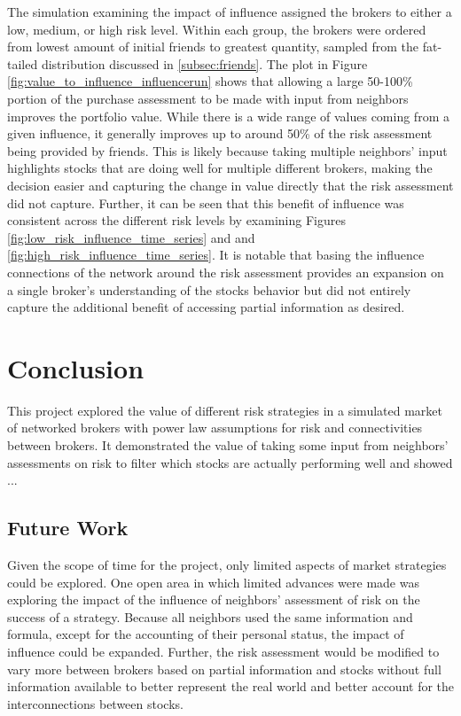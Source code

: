\documentclass[letterpaper, 10 pt, proceedings]{ieeetran}
\begin{document}
	The simulation examining the impact of influence assigned the brokers to either a low, medium, or high risk level. Within each group, the brokers were ordered from lowest amount of initial friends to greatest quantity, sampled from the fat-tailed distribution discussed in \ref{subsec:friends}. The plot in Figure \ref{fig:value_to_influence_influencerun} shows that allowing a large 50-100\% portion of the purchase assessment to be made with input from neighbors improves the portfolio value. While there is a wide range of values coming from a given influence, it generally improves up to around 50\% of the risk assessment being provided by friends. This is likely because taking multiple neighbors' input highlights stocks that are doing well for multiple different brokers, making the decision easier and capturing the change in value directly that the risk assessment did not capture. Further, it can be seen that this benefit of influence was consistent across the different risk levels by examining Figures \ref{fig:low_risk_influence_time_series} and  and \ref{fig:high_risk_influence_time_series}. It is notable that basing the influence connections of the network around the risk assessment provides an expansion on a single broker's understanding of the stocks behavior  but did not entirely capture the additional benefit of accessing partial information as desired.
	
	
	\section{Conclusion}\label{sec:conclusion}
	This project explored the value of different risk strategies in a simulated market of networked brokers with power law assumptions for risk and connectivities between brokers. It demonstrated the value of taking some input from neighbors' assessments on risk to filter which stocks are actually performing well and showed ... %
	
	\subsection{Future Work}\label{subsec:futurework}
	Given the scope of time for the project, only limited aspects of market strategies could be explored. One open area in which limited advances were made was exploring the impact of the influence of neighbors' assessment of risk on the success of a strategy. Because all neighbors used the same information and formula, except for the accounting of their personal status, the impact of influence could be expanded. Further, the risk assessment would be modified to vary more between brokers based on partial information and stocks without full information available to better represent the real world and better account for the interconnections between stocks. 
\end{document}
